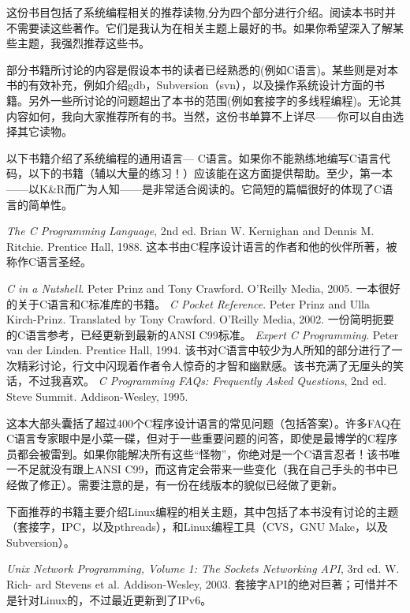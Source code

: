 这份书目包括了系统编程相关的推荐读物,分为四个部分进行介绍。阅读本书时并不需要读这些著作。它们是我认为在相关主题上最好的书。如果你希望深入了解某些主题，我强烈推荐这些书。

部分书籍所讨论的内容是假设本书的读者已经熟悉的(例如C语言)。某些则是对本书的有效补充，例如介绍gdb，Subversion（svn），以及操作系统设计方面的书籍。另外一些所讨论的问题超出了本书的范围(例如套接字的多线程编程)。无论其内容如何，我向大家推荐所有的书。当然，这份书单算不上详尽——你可以自由选择其它读物。

以下书籍介绍了系统编程的通用语言--- C语言。如果你不能熟练地编写C语言代码，以下的书籍（辅以大量的练习！）应该能在这方面提供帮助。至少，第一本——以K\&R而广为人知——是非常适合阅读的。它简短的篇幅很好的体现了C语言的简单性。

\textit{The C Programming Language}, 2nd ed. Brian W. Kernighan and Dennis M. Ritchie.
    Prentice Hall, 1988.
    这本书由C程序设计语言的作者和他的伙伴所著，被称作C语言圣经。

\textit{C in a Nutshell}. Peter Prinz and Tony Crawford. O’Reilly Media, 2005.
    一本很好的关于C语言和C标准库的书籍。
\textit{C Pocket Reference}. Peter Prinz and Ulla Kirch-Prinz. Translated by Tony Crawford.
    O’Reilly Media, 2002.
    一份简明扼要的C语言参考，已经更新到最新的ANSI C99标准。
\textit{Expert C Programming}. Peter van der Linden. Prentice Hall, 1994.
    该书对C语言中较少为人所知的部分进行了一次精彩讨论，行文中闪现着作者令人惊奇的才智和幽默感。该书充满了无厘头的笑话，不过我喜欢。
\textit{C Programming FAQs: Frequently Asked Questions}, 2nd ed. Steve Summit. Addison-Wesley, 1995.
    
    这本大部头囊括了超过400个C程序设计语言的常见问题（包括答案）。许多FAQ在C语言专家眼中是小菜一碟，但对于一些重要问题的问答，即使是最博学的C程序员都会被雷到。如果你能解决所有这些“怪物”，你绝对是一个C语言忍者！该书唯一不足就没有跟上ANSI C99，而这肯定会带来一些变化（我在自己手头的书中已经做了修正）。需要注意的是，有一份在线版本的貌似已经做了更新。

下面推荐的书籍主要介绍Linux编程的相关主题，其中包括了本书没有讨论的主题（套接字，IPC，以及pthreads），和Linux编程工具（CVS，GNU Make，以及Subversion）。

\textit{Unix Network Programming, Volume 1: The Sockets Networking API}, 3rd ed. W. Rich-
    ard Stevens et al. Addison-Wesley, 2003.
    套接字API的绝对巨著；可惜并不是针对Linux的，不过最近更新到了IPv6。

